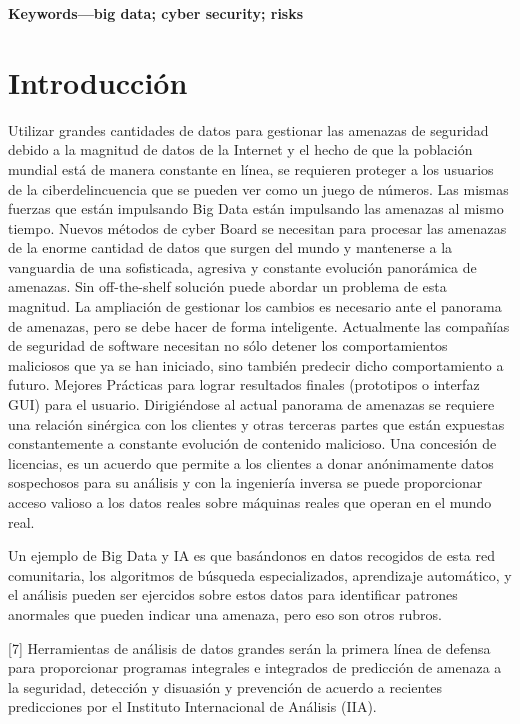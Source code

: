 \documentclass[journal]{IEEEtran}
\begin{document}
\textbf{Keywords—big data; cyber security; risks}\\ 


\IEEEpeerreviewmaketitle



\section{Introducción}

 Utilizar grandes cantidades de datos para gestionar las amenazas de seguridad debido a la magnitud de datos de la Internet y el hecho de que la población mundial está de manera constante en línea, se requieren proteger a los usuarios de la ciberdelincuencia que se pueden ver como un juego de números. Las mismas fuerzas que están impulsando Big Data están impulsando las amenazas al mismo tiempo. Nuevos métodos de cyber Board se necesitan  para procesar las amenazas  de la enorme cantidad de datos que surgen del mundo y mantenerse a la vanguardia de una sofisticada, agresiva y constante evolución panorámica de amenazas. Sin off-the-shelf solución puede abordar un problema de esta magnitud. La ampliación de gestionar los cambios es necesario ante el panorama de amenazas, pero se debe hacer de forma inteligente. Actualmente las compañías de seguridad de software necesitan no sólo detener los comportamientos maliciosos que ya se han iniciado, sino también predecir dicho comportamiento a futuro. Mejores Prácticas para lograr resultados finales (prototipos o interfaz GUI) para el usuario. Dirigiéndose al actual panorama de amenazas se requiere una relación sinérgica con los clientes y otras terceras partes que están expuestas constantemente a constante evolución de contenido malicioso. Una concesión de licencias, es un acuerdo que permite a los clientes a donar anónimamente datos sospechosos para su análisis y con la ingeniería inversa se puede proporcionar acceso valioso a los datos reales sobre máquinas reales que operan en el mundo real.

Un ejemplo de Big Data y IA es que basándonos en datos recogidos de esta red comunitaria, los algoritmos de búsqueda especializados, aprendizaje automático, y el análisis pueden ser ejercidos sobre estos datos para identificar patrones anormales que pueden indicar una amenaza, pero eso son otros rubros.

[7] Herramientas de análisis de datos grandes serán la primera línea de defensa para proporcionar programas integrales e integrados de predicción de amenaza a la seguridad, detección y disuasión y prevención de acuerdo a recientes predicciones por el Instituto Internacional de Análisis (IIA).
\end{document}

